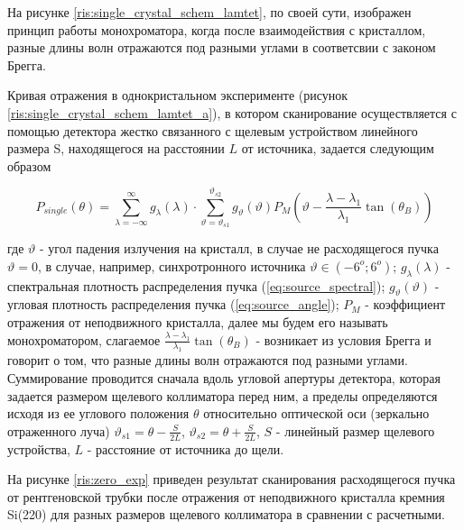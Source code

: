 На рисунке \ref{ris:single_crystal_schem_lamtet}, по своей сути, изображен принцип работы монохроматора,
когда после взаимодействия с кристаллом, разные длины волн отражаются под разными углами в
соответсвии с законом Брегга.

Кривая отражения в однокристальном эксперименте (рисунок \ref{ris:single_crystal_schem_lamtet_a}), в котором сканирование осуществляется
 с помощью детектора жестко связанного с щелевым устройством линейного размера S, находящегося на расстоянии $L$ от источника, задается следующим образом

\begin{equation} \label{eq:p_single_crystal}
  P_{single}(\theta) = \sum_{\lambda = -\infty}^{\infty}g_{\lambda}(\lambda) \cdot \sum_{\vartheta = \vartheta_{s1}}^{\vartheta_{s2}}
  g_{\vartheta}(\vartheta) P_M(\vartheta - \frac{\lambda - \lambda_1}{\lambda_1}\tan(\theta_B))
 \end{equation}

где $\vartheta$ - угол падения излучения на кристалл, в случае не расходящегося пучка $\vartheta = 0$, в
случае, например, синхротронного источника $\vartheta \in (-6^o; 6^o) $; $g_{\lambda}(\lambda)$
- спектральная плотность распределения пучка (\ref{eq:source_spectral}); $g_{\vartheta}(\vartheta)$ - угловая плотность
распределения пучка (\ref{eq:source_angle}); $P_M$ - коэффициент отражения от неподвижного кристалла, далее мы будем его называть монохроматором,
слагаемое $\frac{\lambda - \lambda_1}{\lambda_1}\tan(\theta_B)$ -
возникает из условия Брегга и говорит о том, что разные длины волн отражаются под разными углами.
 Суммирование проводится сначала вдоль угловой апертуры детектора, которая задается размером
 щелевого коллиматора перед ним, а пределы определяются исходя из ее углового положения $\theta$ относительно
 оптической оси (зеркально отраженного луча) $\vartheta_{s1} = \theta - \frac{S}{2L}$, $\vartheta_{s2} = \theta + \frac{S}{2L}$,
 $S $ - линейный размер щелевого устройства, $L$ - расстояние от источника до щели.



На рисунке \ref{ris:zero_exp} приведен результат сканирования расходящегося пучка от рентгеновской
трубки после отражения от неподвижного кристалла кремния Si(220) для разных размеров щелевого коллиматора
в сравнении с расчетными.
